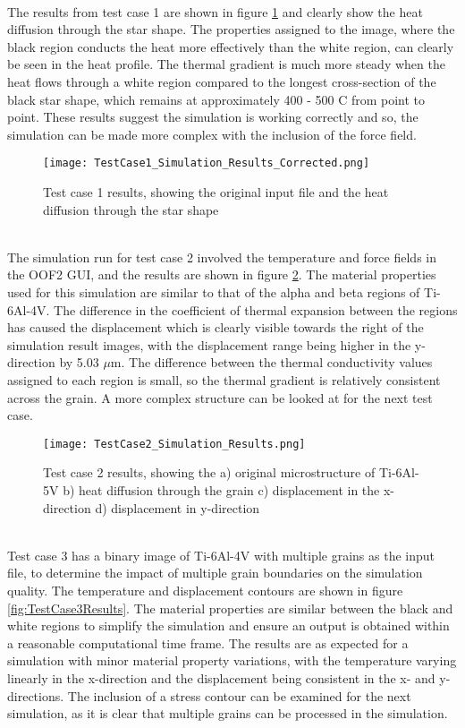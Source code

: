 \documentclass[report.tex]{subfiles}
\begin{document}
\\
The results from test case 1 are shown in figure \ref{fig:TestCase1Results} and clearly show the heat diffusion through the star shape. The properties assigned to the image, where the black region conducts the heat more effectively than the white region, can clearly be seen in the heat profile. The thermal gradient is much more steady when the heat flows through a white region compared to the longest cross-section of the black star shape, which remains at approximately 400 - 500 \degree C from point to point. These results suggest the simulation is working correctly and so, the simulation can be made more complex with the inclusion of the force field.
\\
\begin{figure}[h]
    \centering
    \texttt{[image: TestCase1\_Simulation\_Results\_Corrected.png]}
    \caption{Test case 1 results, showing the original input file and the heat diffusion through the star shape}
    \label{fig:TestCase1Results}
\end{figure}
\\
The simulation run for test case 2 involved the temperature and force fields in the OOF2 GUI, and the results are shown in figure \ref{fig:TestCase2Results}. The material properties used for this simulation are similar to that of the alpha and beta regions of Ti-6Al-4V. The difference in the coefficient of thermal expansion between the regions has caused the displacement which is clearly visible towards the right of the simulation result images, with the displacement range being higher in the y-direction by 5.03 $\mu$m. The difference between the thermal conductivity values assigned to each region is small, so the thermal gradient is relatively consistent across the grain. A more complex structure can be looked at for the next test case.
\\
\begin{figure}[htp]
    \centering
    \texttt{[image: TestCase2\_Simulation\_Results.png]}
    \caption{Test case 2 results, showing the a) original microstructure of Ti-6Al-5V b) heat diffusion through the grain c) displacement in the x-direction d) displacement in y-direction}
    \label{fig:TestCase2Results}
\end{figure}
\\
Test case 3 has a binary image of Ti-6Al-4V with multiple grains as the input file, to determine the impact of multiple grain boundaries on the simulation quality. The temperature and displacement contours are shown in figure \ref{fig:TestCase3Results}. The material properties are similar between the black and white regions to simplify the simulation and ensure an output is obtained within a reasonable computational time frame. The results are as expected for a simulation with minor material property variations, with the temperature varying linearly in the x-direction and the displacement being consistent in the x- and y-directions. The inclusion of a stress contour can be examined for the next simulation, as it is clear that multiple grains can be processed in the simulation.
\end{document}
